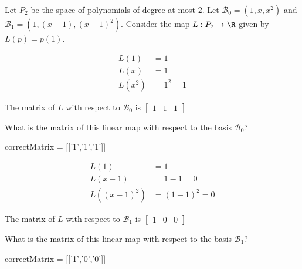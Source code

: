 \documentclass{ximera}
\begin{document}
\begin{problem}
	Let $P_2$ be the space of polynomials of degree at most $2$.  Let $\mathcal{B}_0 = (1,x,x^2)$ and $\mathcal{B}_1 = (1,(x-1),(x-1)^2)$.  
	Consider the map $L:P_2 \to \R$ given by $L(p) = p(1)$.  
	\begin{solution}
	\begin{hint}
		\begin{align*}
			L(1) &= 1\\
			L(x) &= 1\\
			L(x^2)&=1^2=1
		\end{align*}
	\end{hint}
	\begin{hint}
	\begin{bmatrix}
		The matrix of $L$ with respect to $\mathcal{B}_0$ is \( \begin{bmatrix} 1&1&1 \end{bmatrix}\)
	\end{bmatrix}
	\end{hint}
	What is the matrix of this linear map with respect to the basis $\mathcal{B}_0$?  
	\begin{matrix-answer}
		correctMatrix = [['1','1','1']]
	\end{matrix-answer}
	\end{solution}
		
	\begin{solution}
	\begin{hint}
		\begin{align*}
			L(1) &= 1\\
			L(x-1) &= 1-1=0\\
			L((x-1)^2)&=(1-1)^2=0
		\end{align*}
	\end{hint}
	\begin{hint}
	\begin{bmatrix}
		The matrix of $L$ with respect to $\mathcal{B}_1$ is \( \begin{bmatrix} 1&0&0 \end{bmatrix}\)
	\end{bmatrix}
	\end{hint}
	What is the matrix of this linear map with respect to the basis $\mathcal{B}_1$?  
	
	\begin{matrix-answer}
		correctMatrix = [['1','0','0']]
	\end{matrix-answer}
	\end{solution}
\end{problem}
\end{document}
